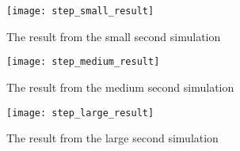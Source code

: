 \begin{figure}[t]
	\texttt{[image: step\_small\_result]}
	\caption{The result from the small second simulation} 
	\label{fig:stepSmallResult}
\end{figure}

\begin{figure}[t]
	\texttt{[image: step\_medium\_result]}
	\caption{The result from the medium second simulation} 
	\label{fig:stepMediumResult}
\end{figure}

\begin{figure}[t]
	\texttt{[image: step\_large\_result]}
	\caption{The result from the large second simulation} 
	\label{fig:stepLargeResult}
\end{figure}



